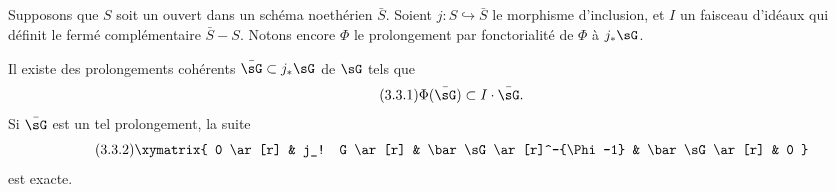 \subsection{}\label{III:3-2}

Supposons que $S$ soit un ouvert dans un schéma noethérien $\bar S$. 
Soient $j:S\hookrightarrow \bar S$ le morphisme d'inclusion, et $I$ un 
faisceau d'idéaux qui définit le fermé complémentaire 
$\bar S-S$. Notons encore $\Phi$ le prolongement par fonctorialité 
de $\Phi$ à $j_*\sG$. 





\begin{lemma_}\label{III:3-3}
Il existe des prolongements cohérents $\bar\sG\subset j_*\sG$ de $\sG$ tels 
que 
\begin{equation*}\tag{3.3.1}\label{III:eq:3-3-1}
  \Phi(\bar\sG)\subset I\cdot \bar\sG\text{.}
\end{equation*}
Si $\bar\sG$ est un tel prolongement, la suite 
\begin{equation*}\tag{3.3.2}\label{III:eq:3-3-2}
\xymatrix{
  0 \ar[r] 
    & j_! G \ar[r] 
    & \bar\sG \ar[r]^-{\Phi-1} 
    & \bar\sG \ar[r] 
    & 0
}
\end{equation*}
est exacte.
\end{lemma_}
